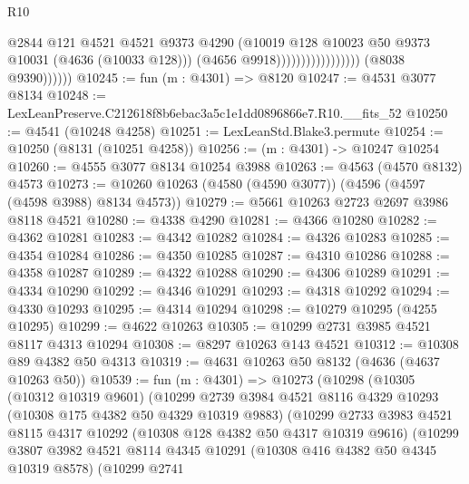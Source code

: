 \begin{lexlean}{R10}
\begin{coremodule}
                                              @2844
                                              @121
                                              @4521
                                              @4521
                                              @9373
                                              @4290
                                              (@10019
                                                @128
                                                @10023
                                                @50
                                                @9373
                                                @10031
                                                (@4636 (@10033 @128)))
                                              (@4656 @9918)))))))))))))))))
              (@8038 @9390))))))
@10245 := fun (m : @4301) => @8120
@10247 := @4531 @3077 @8134
@10248 := LexLeanPreserve.C212618f8b6ebac3a5c1e1dd0896866e7.R10.__fits_52
@10250 := @4541 (@10248 @4258)
@10251 := LexLeanStd.Blake3.permute
@10254 := @10250 (@8131 (@10251 @4258))
@10256 := (m : @4301) -> @10247 @10254
@10260 := @4555 @3077 @8134 @10254 @3988
@10263 := @4563 (@4570 @8132) @4573
@10273 := @10260 @10263 (@4580 (@4590 @3077)) (@4596 (@4597 (@4598 @3988) @8134 @4573))
@10279 := @5661 @10263 @2723 @2697 @3986 @8118 @4521
@10280 := @4338 @4290
@10281 := @4366 @10280
@10282 := @4362 @10281
@10283 := @4342 @10282
@10284 := @4326 @10283
@10285 := @4354 @10284
@10286 := @4350 @10285
@10287 := @4310 @10286
@10288 := @4358 @10287
@10289 := @4322 @10288
@10290 := @4306 @10289
@10291 := @4334 @10290
@10292 := @4346 @10291
@10293 := @4318 @10292
@10294 := @4330 @10293
@10295 := @4314 @10294
@10298 := @10279 @10295 (@4255 @10295)
@10299 := @4622 @10263
@10305 := @10299 @2731 @3985 @4521 @8117 @4313 @10294
@10308 := @8297 @10263 @143 @4521
@10312 := @10308 @89 @4382 @50 @4313
@10319 := @4631 @10263 @50 @8132 (@4636 (@4637 @10263 @50))
@10539 := fun (m : @4301) =>
  @10273
    (@10298
      (@10305
        (@10312 @10319 @9601)
        (@10299
          @2739
          @3984
          @4521
          @8116
          @4329
          @10293
          (@10308 @175 @4382 @50 @4329 @10319 @9883)
          (@10299
            @2733
            @3983
            @4521
            @8115
            @4317
            @10292
            (@10308 @128 @4382 @50 @4317 @10319 @9616)
            (@10299
              @3807
              @3982
              @4521
              @8114
              @4345
              @10291
              (@10308 @416 @4382 @50 @4345 @10319 @8578)
              (@10299
                @2741

\end{coremodule}
\end{lexlean}
